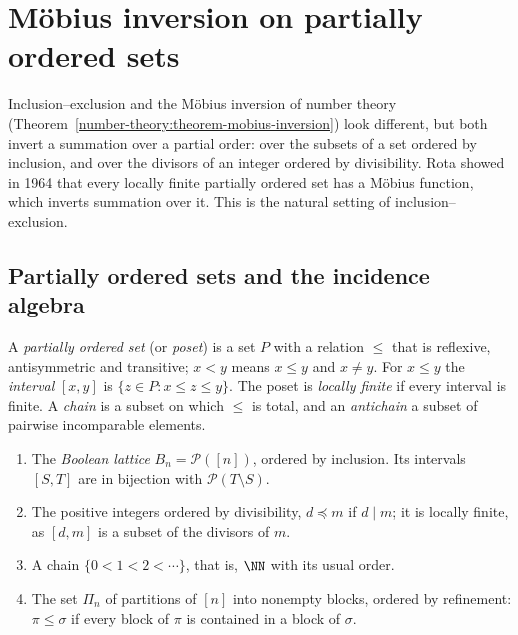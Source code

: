 \section{M\"obius inversion on partially ordered sets}\label{combinatorics:section-posets}

Inclusion--exclusion and the M\"obius inversion of number theory (Theorem~\ref{number-theory:theorem-mobius-inversion}) look different, but both invert a summation over a partial order: over the subsets of
a set ordered by inclusion, and over the divisors of an integer ordered by divisibility. Rota showed in 1964 that every locally finite partially ordered set has a M\"obius function, which inverts summation
over it. This is the natural setting of inclusion--exclusion.

\subsection{Partially ordered sets and the incidence algebra}\label{combinatorics:subsection-incidence-algebra}

\begin{definition}\label{combinatorics:definition-poset}
A \emph{partially ordered set} (or \emph{poset}) is a set $P$ with a relation $\leq$ that is reflexive, antisymmetric and transitive; $x < y$ means $x \leq y$ and $x \neq y$. For $x \leq y$ the
\emph{interval} $[x, y]$ is $\{z \in P : x \leq z \leq y\}$. The poset is \emph{locally finite} if every interval is finite. A \emph{chain} is a subset on which $\leq$ is total, and an
\emph{antichain} a subset of pairwise incomparable elements.
\end{definition}

\begin{example}\label{combinatorics:example-posets}
\begin{enumerate}
\item The \emph{Boolean lattice} $B_n = \mathcal{P}([n])$, ordered by inclusion. Its intervals $[S, T]$ are in bijection with $\mathcal{P}(T \setminus S)$.
\item The positive integers ordered by divisibility, $d \preceq m$ if $d \mid m$; it is locally finite, as $[d, m]$ is a subset of the divisors of $m$.
\item A chain $\{0 < 1 < 2 < \cdots\}$, that is, $\NN$ with its usual order.
\item The set $\Pi_n$ of partitions of $[n]$ into nonempty blocks, ordered by refinement: $\pi \leq \sigma$ if every block of $\pi$ is contained in a block of $\sigma$.
\end{enumerate}
\end{example}

